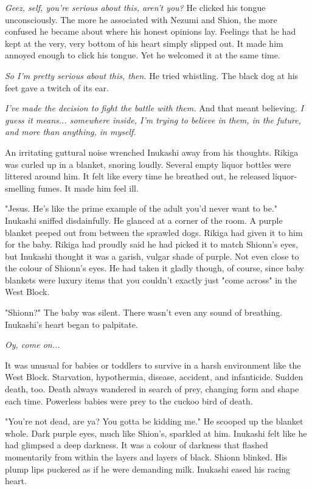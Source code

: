 \emph{Geez, self, you're serious about this, aren't you?} He clicked his tongue
unconsciously. The more he associated with Nezumi and Shion, the more
confused he became about where his honest opinions lay. Feelings that he
had kept at the very, very bottom of his heart simply slipped out. It
made him annoyed enough to click his tongue. Yet he welcomed it at the
same time.

\emph{So I'm pretty serious about this, then.} He tried whistling. The black
dog at his feet gave a twitch of its ear.

\emph{I've made the decision to fight the battle with them.} And that meant
believing. \emph{I guess it means... somewhere inside, I'm trying to believe
	in them, in the future, and more than anything, in myself.}

An irritating guttural noise wrenched Inukashi away from his thoughts.
Rikiga was curled up in a blanket, snoring loudly. Several empty liquor
bottles were littered around him. It felt like every time he breathed
out, he released liquor-smelling fumes. It made him feel ill.

"Jesus. He's like the prime example of the adult you'd never want to
be." Inukashi sniffed disdainfully. He glanced at a corner of the room.
A purple blanket peeped out from between the sprawled dogs. Rikiga had
given it to him for the baby. Rikiga had proudly said he had picked it
to match Shionn's eyes, but Inukashi thought it was a garish, vulgar
shade of purple. Not even close to the colour of Shionn's eyes. He had
taken it gladly though, of course, since baby blankets were luxury items
that you couldn't exactly just "come across" in the West Block.

"Shionn?" The baby was silent. There wasn't even any sound of breathing.
Inukashi's heart began to palpitate.

\emph{Oy, come on...}

It was unusual for babies or toddlers to survive in a harsh environment
like the West Block. Starvation, hypothermia, disease, accident, and
infanticide. Sudden death, too. Death always wandered in search of prey,
changing form and shape each time. Powerless babies were prey to the
cuckoo bird of death.

"You're not dead, are ya? You gotta be kidding me." He scooped up the
blanket whole. Dark purple eyes, much like Shion's, sparkled at him.
Inukashi felt like he had glimpsed a deep darkness. It was a colour of
darkness that flashed momentarily from within the layers and layers of
black. Shionn blinked. His plump lips puckered as if he were demanding
milk. Inukashi eased his racing heart.

